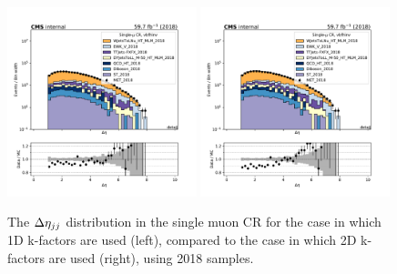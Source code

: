 \begin{figure}
    \begin{center}
        \includegraphics[width=0.49\textwidth]{fig/datamc_1dkfac/cr_1m_vbf/cr_1m_vbf_detajj_losf_2018.pdf}
        \includegraphics[width=0.49\textwidth]{fig/datamc/cr_1m_vbf/cr_1m_vbf_detajj_losf_2018.pdf} 
        \caption{The $\Delta \eta_{jj}$ distribution in the single muon CR for the case in which 1D k-factors are used (left), 
        compared to the case in which 2D k-factors are used (right), using 2018 samples.}
        \label{fig:detajj_2018}
    \end{center}
\end{figure}

